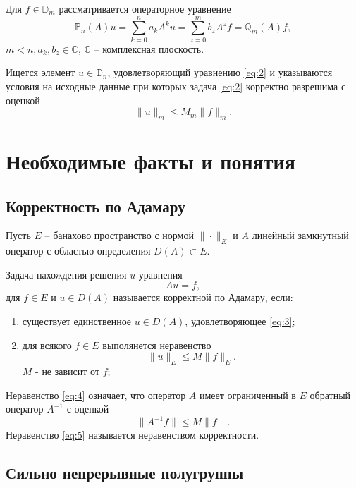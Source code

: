 \documentclass[14pt,a4paper]{article}
\theoremstyle{plain}
\numberwithin{equation}{section}
\begin{document}
Для $f \in \mathbb{D}_m$ рассматривается операторное уравнение
\begin{equation}
    \label{eq:2}
    \mathbb{P}_n(A)u = \sum_{k=0}^{n}a_k A^k u = \sum_{z=0}^{m} b_z A^z f = \mathbb{Q}_m(A)f,
\end{equation}
$m < n, a_k, b_z \in \mathbb{C}$, $\mathbb{C}$ -- комплексная плоскость.

Ищется элемент $u \in \mathbb{D}_n$, удовлетворяющий уравнению \ref{eq:2} и указываются условия
на исходные данные при которых задача \ref{eq:2} корректно разрешима с оценкой
\begin{equation}
    \|u\|_m \le M_m \|f\|_m.
\end{equation}

\section{Необходимые факты и понятия}

\subsection{Корректность по Адамару}

Пусть $E$ -- банахово пространство с нормой $\|\cdot\|_E$ и $A$ линейный замкнутный оператор с областью
определения $D(A) \subset E$.

Задача нахождения решения $u$ уравнения
\begin{equation}
    \label{eq:3}
    Au = f,
\end{equation}
для $f \in E$ и $u \in D(A)$ называется корректной по Адамару, если:
\begin{enumerate}
    \item существует единственное $u \in D(A)$, удовлетворяющее \ref{eq:3};
    \item для всякого $f \in E$ выполянется неравенство
    \begin{equation}
        \label{eq:4}
        \|u\|_E \le M \|f\|_E.
    \end{equation}
    $M$ - не зависит от $f$;
\end{enumerate}
Неравенство \ref{eq:4} означает, что оператор $A$ имеет ограниченный в $E$ обратный оператор $A^{-1}$ с оценкой
\begin{equation}
    \label{eq:5}
    \|A^{-1}f\| \le M \|f\|.
\end{equation}
Неравенство \ref{eq:5} называется неравенством корректности.

\subsection{Сильно непрерывные полугруппы}
\end{document}
